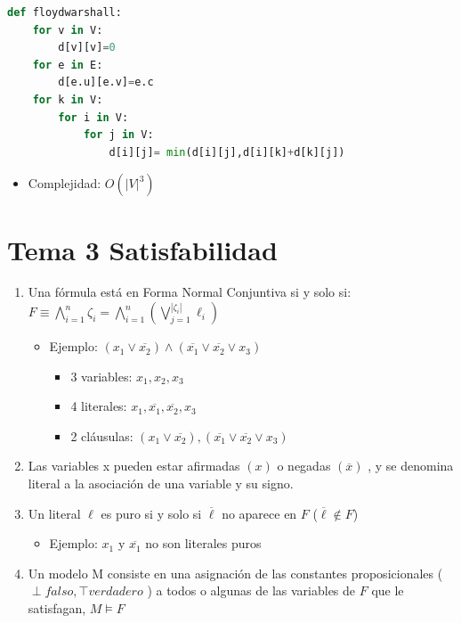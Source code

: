 \documentclass[12pt, twoside, openright]{report} %
\begin{document}
\begin{lstlisting}[language=Python]
def floydwarshall:
	for v in V:
		d[v][v]=0
	for e in E:
		d[e.u][e.v]=e.c
	for k in V:
		for i in V: 
			for j in V:
				d[i][j]= min(d[i][j],d[i][k]+d[k][j])
\end{lstlisting}

  \begin{itemize}
  \item Complejidad: \(O(|V|^3)\)
  \end{itemize}
  

\chapter{Tema 3 Satisfabilidad}

  \begin{enumerate}

  \item
    Una fórmula está en Forma Normal Conjuntiva si y solo si:
    \(F \equiv \bigwedge_{i=1}^{n} \zeta_i= \bigwedge_{i=1}^{n} (\bigvee_{j=1}^{\left | \zeta_i \right |} \ell_i)\)
	\vspace{-0.5cm}
    \begin{itemize}
    \item Ejemplo:
      \((x_1 \vee \overline{x_2})\wedge (\overline{x_1} \vee \overline{x_2} \vee x_3)\)

      \begin{itemize}
    
      \item
        3 variables: \(x_1, x_2, x_3\)
      \item
        4 literales: \(x_1,\overline{x_1}, \overline{x_2}, x_3\)
      \item
        2 cláusulas:
        \((x_1 \vee \overline{x_2}),(\overline{x_1} \vee \overline{x_2} \vee x_3)\)
      \end{itemize}
    \end{itemize}
  \item
    Las variables x pueden estar afirmadas \((x)\) o negadas
    \((\overline{x})\) , y se denomina literal a la asociación de una
    variable y su signo.
  \item
    Un literal \(\ell\) es puro si y solo si \(\overline{\ell}\) no
    aparece en \(F\) (\(\overline{\ell} \notin F\))

    \begin{itemize}
  
    \item
      Ejemplo: \(x_1\) y \(\overline{x_1}\) no son literales puros
    \end{itemize}
  \item
    Un modelo M consiste en una asignación de las constantes
    proposicionales (\(\perp falso,\top verdadero\) ) a todos o algunas
    de las variables de \(F\) que le satisfagan, \(M \models F\)
  \end{enumerate}
\end{document}
